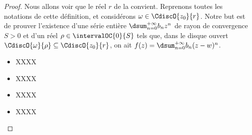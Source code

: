 \begin{proof}
    Nous allons voir que le réel $r$ de la  convient. Reprenons toutes les notations de cette définition, et considérons $\omega \in \CdiscO{z_0}{r}$.
    Notre but est de prouver l'existence d'une série entière $\dsum_{n = 0}^{+\infty} b_n z^n$
	de rayon de convergence $S > 0$
	et
	d'un réel $\rho \in \intervalOC{0}{S}$
	tels que,
	dans le disque ouvert $\CdiscO{\omega}{\rho} \subseteq \CdiscO{z_0}{r}$,
	on ait
	$f(z) = \dsum_{n = 0}^{+\infty} b_n (z - w)^n$.
	\begin{itemize}
		\item XXXX
	

		\item XXXX
	

		\item XXXX
	

		\item XXXX
	\end{itemize}
\end{proof}
%
%
%
%
%
%
%
%
%
%
%
%
%
%
%
%
%
%
%

